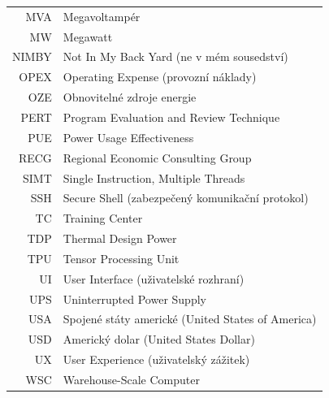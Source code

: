 \documentclass[czech,bachelor,oneside]{ctufit-thesis}
\begin{document}
\begin{longtable}{rl}
    MVA     & Megavoltampér \\
    MW      & Megawatt \\
    NIMBY   & Not In My Back Yard (ne v mém sousedství) \\
    OPEX    & Operating Expense (provozní náklady) \\
    OZE     & Obnovitelné zdroje energie \\
    PERT    & Program Evaluation and Review Technique \\
    PUE     & Power Usage Effectiveness \\
    RECG    & Regional Economic Consulting Group \\
    SIMT    & Single Instruction, Multiple Threads \\
    SSH     & Secure Shell (zabezpečený komunikační protokol) \\
    TC      & Training Center \\
    TDP     & Thermal Design Power \\
    TPU     & Tensor Processing Unit \\
    UI      & User Interface (uživatelské rozhraní) \\
    UPS     & Uninterrupted Power Supply \\
    USA     & Spojené státy americké (United States of America) \\
    USD     & Americký dolar (United States Dollar) \\
    UX      & User Experience (uživatelský zážitek) \\
    WSC     & Warehouse-Scale Computer \\
\end{longtable}

\resumeTOCentries
\mainmatter\mainmatterinit %












\appendix\appendixinit %


\backmatter %

\printbibliography[heading=bibintoc] %

\end{document}
